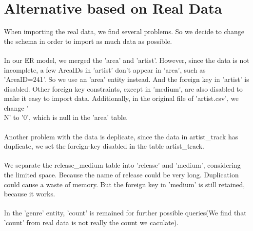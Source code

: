 \documentclass[11pt]{article} %
\begin{document}
\section{Alternative based on Real Data}
\normalsize{
When importing the real data, we find several problems. So we decide to change the schema in order to import as much data as possible. \\ \\
In our ER model, we merged the 'area' and 'artist'. However, since the data is not incomplete, a few AreaIDs in 'artist' don't appear in 'area', such as 'AreaID=241'. So we use an 'area' entity instead. And the foreign key in 'artist' is disabled. Other foreign key constraints, except in 'medium', are also disabled to make it easy to import data. Additionally, in the original file of 'artist.csv', we change '\\N' to '0', which is null in the 'area' table.\\ \\
Another problem with the data is deplicate, since the data in artist\_track has duplicate, we set the foreign-key disabled in the table artist\_track.\\ \\
We separate the release\_medium table into 'release' and 'medium', considering the limited space. Because the name of release could be very long. Duplication could  cause a waste of memory. But the foreign key in 'medium' is still retained, because it works.\\ \\
In the 'genre' entity, 'count' is remained for further possible queries(We find that 'count' from real data is not really the count we caculate).\\ \\}
\end{document}
